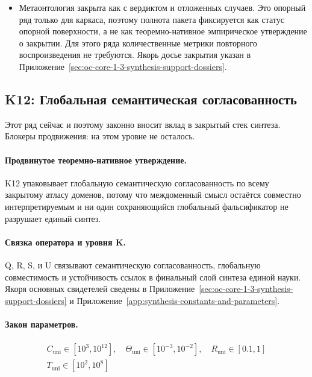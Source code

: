 \begin{itemize}[leftmargin=1.6em,nosep]
\item Метаонтология закрыта как  с вердиктом  и  отложенных случаев. Это опорный ряд только для каркаса, поэтому полнота пакета фиксируется как статус опорной поверхности, а не как теоремно-нативное эмпирическое утверждение о закрытии. Для этого ряда количественные метрики повторного воспроизведения не требуются. Якорь досье закрытия указан в Приложение~\ref{sec:oc-core-1-3-synthesis-support-dossiers}.
\end{itemize}

\subsection{K12: Глобальная семантическая согласованность}
\label{sec:oc-core-1-3-synthesis-k12}
Этот ряд сейчас  и поэтому законно вносит вклад в закрытый стек синтеза.
Блокеры продвижения: на этом уровне не осталось.

\paragraph{Продвинутое теоремно-нативное утверждение.}
K12 упаковывает глобальную семантическую согласованность по всему закрытому атласу доменов, потому что междоменный смысл остаётся совместно интерпретируемым и ни один сохраняющийся глобальный фальсификатор не разрушает единый синтез.

\paragraph{Связка оператора и уровня K.}
Q, R, S, и U связывают семантическую согласованность, глобальную совместимость и устойчивость ссылок в финальный слой синтеза единой науки.
Якоря основных свидетелей сведены в Приложение~\ref{sec:oc-core-1-3-synthesis-support-dossiers} и Приложение~\ref{app:synthesis-constants-and-parameters}.

\paragraph{Закон параметров.}
\[
\begin{gathered} C_{\mathrm{uni}} \in [10^3,10^{12}],\quad \Theta_{\mathrm{uni}} \in [10^{-3},10^{-2}],\quad R_{\mathrm{uni}} \in [0.1,1] \\ T_{\mathrm{uni}} \in [10^2,10^8] \end{gathered}
\]


